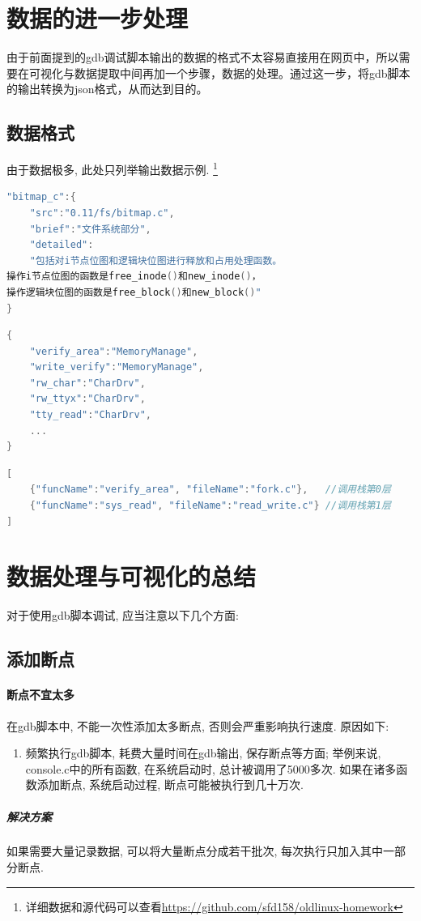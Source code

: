 \documentclass[]{report}
\begin{document}
\section{数据的进一步处理}

由于前面提到的gdb调试脚本输出的数据的格式不太容易直接用在网页中，所以需要在可视化与数据提取中间再加一个步骤，数据的处理。通过这一步，将gdb脚本的输出转换为json格式，从而达到目的。

\subsection{数据格式}
由于数据极多, 此处只列举输出数据示例. 
\footnote{详细数据和源代码可以查看\url{https://github.com/sfd158/oldlinux-homework}}
\begin{lstlisting}[language=c++,caption={文件功能说明}]
"bitmap_c":{
    "src":"0.11/fs/bitmap.c",
    "brief":"文件系统部分",
    "detailed":
    "包括对i节点位图和逻辑块位图进行释放和占用处理函数。
操作i节点位图的函数是free_inode()和new_inode()，
操作逻辑块位图的函数是free_block()和new_block()"
}
\end{lstlisting}

\begin{lstlisting}[language=c++,caption={函数类别说明}]
{
    "verify_area":"MemoryManage",
    "write_verify":"MemoryManage",
    "rw_char":"CharDrv",
    "rw_ttyx":"CharDrv",
    "tty_read":"CharDrv",
    ...
}
\end{lstlisting}

\begin{lstlisting}[language=c++,caption={执行过程记录}]
[
    {"funcName":"verify_area", "fileName":"fork.c"},   //调用栈第0层
    {"funcName":"sys_read", "fileName":"read_write.c"} //调用栈第1层
]
\end{lstlisting}

\section{数据处理与可视化的总结}

对于使用gdb脚本调试, 应当注意以下几个方面:
\subsection{添加断点}

\paragraph{断点不宜太多}在gdb脚本中, 不能一次性添加太多断点, 否则会严重影响执行速度. 原因如下:
\begin{enumerate}
    \item 频繁执行gdb脚本, 耗费大量时间在gdb输出, 保存断点等方面;
    \subitem 举例来说, console.c中的所有函数, 在系统启动时, 总计被调用了5000多次.
    \subitem 如果在诸多函数添加断点, 系统启动过程, 断点可能被执行到几十万次.
\end{enumerate}
\subparagraph{解决方案}
如果需要大量记录数据, 可以将大量断点分成若干批次, 每次执行只加入其中一部分断点. 
\end{document}
